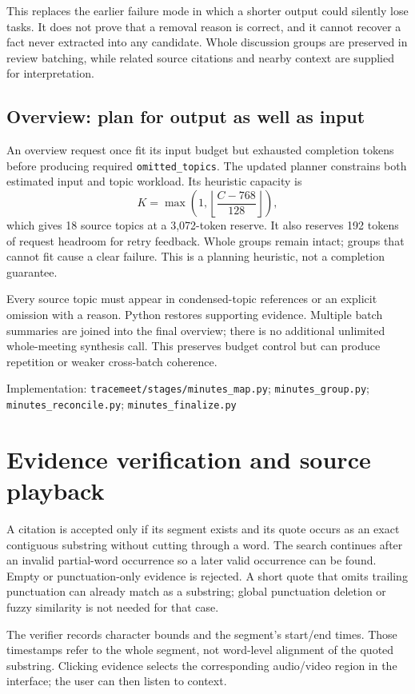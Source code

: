 \documentclass[11pt,a4paper]{article}
\newcommand{\code}[1]{\nolinkurl{#1}}
\newcommand{\src}[1]{\par{\footnotesize\raggedright\textcolor{accent}{Implementation:} #1\par}}
\begin{document}
This replaces the earlier failure mode in which a shorter output could silently lose tasks. It does not prove that a removal reason is correct, and it cannot recover a fact never extracted into any candidate. Whole discussion groups are preserved in review batching, while related source citations and nearby context are supplied for interpretation.

\subsection{Overview: plan for output as well as input}
An overview request once fit its input budget but exhausted completion tokens before producing required \code{omitted_topics}. The updated planner constrains both estimated input and topic workload. Its heuristic capacity is
\[
K=\max\left(1,\left\lfloor\frac{C-768}{128}\right\rfloor\right),
\]
which gives 18 source topics at a 3,072-token reserve. It also reserves 192 tokens of request headroom for retry feedback. Whole groups remain intact; groups that cannot fit cause a clear failure. This is a planning heuristic, not a completion guarantee.

Every source topic must appear in condensed-topic references or an explicit omission with a reason. Python restores supporting evidence. Multiple batch summaries are joined into the final overview; there is no additional unlimited whole-meeting synthesis call. This preserves budget control but can produce repetition or weaker cross-batch coherence.
\src{\code{tracemeet/stages/minutes_map.py}; \code{minutes_group.py}; \code{minutes_reconcile.py}; \code{minutes_finalize.py}}

\section{Evidence verification and source playback}
A citation is accepted only if its segment exists and its quote occurs as an exact contiguous substring without cutting through a word. The search continues after an invalid partial-word occurrence so a later valid occurrence can be found. Empty or punctuation-only evidence is rejected. A short quote that omits trailing punctuation can already match as a substring; global punctuation deletion or fuzzy similarity is not needed for that case.

The verifier records character bounds and the segment's start/end times. Those timestamps refer to the whole segment, not word-level alignment of the quoted substring. Clicking evidence selects the corresponding audio/video region in the interface; the user can then listen to context.
\end{document}
